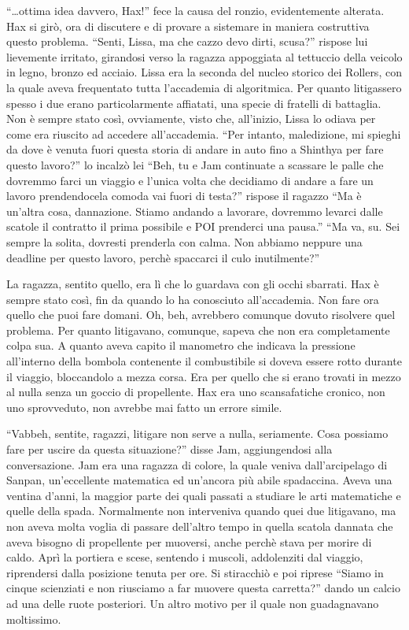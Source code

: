     ``\dots{}ottima idea davvero, Hax!'' fece la causa del ronzio,
    evidentemente alterata. Hax si girò, ora di discutere e di provare a
    sistemare in maniera costruttiva questo problema. ``Senti, Lissa, ma
    che cazzo devo dirti, scusa?'' rispose lui lievemente irritato,
    girandosi verso la ragazza appoggiata al tettuccio della veicolo in
    legno, bronzo ed acciaio. Lissa era la seconda del nucleo storico dei
    Rollers, con la quale aveva frequentato tutta l'accademia di
    algoritmica. Per quanto litigassero spesso i due erano particolarmente
    affiatati, una specie di fratelli di battaglia. Non è sempre stato
    così, ovviamente, visto che, all'inizio, Lissa lo odiava per come era
    riuscito ad accedere all'accademia. ``Per intanto, maledizione, mi
    spieghi da dove è venuta fuori questa storia di andare in auto fino a
    Shinthya per fare questo lavoro?'' lo incalzò lei ``Beh, tu e Jam
    continuate a scassare le palle che dovremmo farci un viaggio e l'unica
    volta che decidiamo di andare a fare un lavoro prendendocela comoda vai
    fuori di testa?'' rispose il ragazzo ``Ma è un'altra cosa, dannazione.
    Stiamo andando a lavorare, dovremmo levarci dalle scatole il contratto
    il prima possibile e POI prenderci una pausa.'' ``Ma va, su. Sei sempre
    la solita, dovresti prenderla con calma. Non abbiamo neppure una
    deadline per questo lavoro, perchè spaccarci il culo inutilmente?''

    La ragazza, sentito quello, era lì che lo guardava con gli occhi
    sbarrati. Hax è sempre stato così, fin da quando lo ha conosciuto
    all'accademia. Non fare ora quello che puoi fare domani. Oh, beh,
    avrebbero comunque dovuto risolvere quel problema. Per quanto
    litigavano, comunque, sapeva che non era completamente colpa sua. A
    quanto aveva capito il manometro che indicava la pressione all'interno
    della bombola contenente il combustibile si doveva essere rotto durante
    il viaggio, bloccandolo a mezza corsa. Era per quello che si erano
    trovati in mezzo al nulla senza un goccio di propellente. Hax era uno
    scansafatiche cronico, non uno sprovveduto, non avrebbe mai fatto un
    errore simile.
    
    ``Vabbeh, sentite, ragazzi, litigare non serve a nulla, seriamente.
    Cosa possiamo fare per uscire da questa situazione?'' disse Jam,
    aggiungendosi alla conversazione. Jam era una ragazza di colore, la
    quale veniva dall'arcipelago di Sanpan, un'eccellente matematica ed
    un'ancora più abile spadaccina. Aveva una ventina d'anni, la maggior
    parte dei quali passati a studiare le arti matematiche e quelle della
    spada. Normalmente non interveniva quando quei due litigavano, ma non
    aveva molta voglia di passare dell'altro tempo in quella scatola
    dannata che aveva bisogno di propellente per muoversi, anche perchè
    stava per morire di caldo. Aprì la portiera e scese, sentendo i
    muscoli, addolenziti dal viaggio, riprendersi dalla posizione tenuta
    per ore. Si stiracchiò e poi riprese ``Siamo in cinque scienziati e non
    riusciamo a far muovere questa carretta?'' dando un calcio ad una delle
    ruote posteriori. Un altro motivo per il quale non guadagnavano
    moltissimo.

